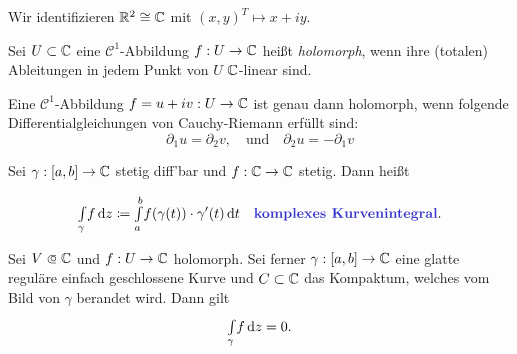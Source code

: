 \documentclass{cheat-sheet}
\theoremstyle{definition}
\begin{document}

\begin{bem}
  Wir identifizieren $\mathbb{R}^2 \cong \mathbb{C}$ mit $(x, y)^T \mapsto x + iy$.
\end{bem}

\begin{defn}
  Sei $U \subset \mathbb{C}$ eine $\mathcal{C}^1$-Abbildung $f : U \to \mathbb{C}$ heißt \emph{holomorph}, wenn ihre (totalen) Ableitungen in jedem Punkt von $U$ $\mathbb{C}$-linear sind.
\end{defn}

\begin{beob}
  Eine $\mathcal{C}^1$-Abbildung $f = u + iv : U \to \mathbb{C}$ ist genau dann holomorph, wenn folgende Differentialgleichungen von Cauchy-Riemann erfüllt sind:
  \[
    \partial_1 u = \partial_2 v,
    \quad \text{und} \quad
    \partial_2 u = - \partial_1 v
  \]
\end{beob}



\begin{defn}
  Sei $\gamma : \left[ a, b \right] \to \mathbb{C}$ stetig diff'bar und $f : \mathbb{C} \to \mathbb{C}$ stetig. Dann heißt

  \[
    \Int{\gamma}{}{f}{z} \coloneqq \Int{a}{b}{f(\gamma(t)) \cdot \gamma'(t)}{t}
    \quad \text{\emph{komplexes Kurvenintegral}.}
  \]
\end{defn}

\begin{satz}
  Sei $V \opn \C$ und $f : U \to \mathbb{C}$ holomorph. Sei ferner $\gamma : \left[ a, b \right] \to \mathbb{C}$ eine glatte reguläre einfach geschlossene Kurve und $C \subset \mathbb{C}$ das Kompaktum, welches vom Bild von $\gamma$ berandet wird. Dann gilt
  \[ {\textstyle \int\limits_{\gamma}^{}} f \,\mathrm{d} z = 0. \]
\end{satz}
\end{document}
